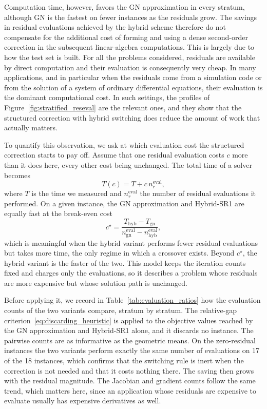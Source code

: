 \documentclass{article}
\numberwithin{equation}{section}
\theoremstyle{plain}
\begin{document}
Computation time, however, favors the GN approximation in every stratum, although GN is the fastest on fewer instances as the residuals grow. The savings in residual evaluations achieved by the hybrid scheme therefore do not compensate for the additional cost of forming and using a dense second-order correction in the subsequent linear-algebra computations. This is largely due to how the test set is built. For all the problems considered, residuals are available by direct computation and their evaluation is consequently very cheap. In many applications, and in particular when the residuals come from a simulation code or from the solution of a system of ordinary differential equations, their evaluation is the dominant computational cost. In such settings, the profiles of Figure~\ref{fig:stratified_reseval} are the relevant ones, and they show that the structured correction with hybrid switching does reduce the amount of work that actually matters. 

To quantify this observation, we ask at which evaluation cost the structured correction starts to pay off. Assume that one residual evaluation costs $c$ more than it does here, every other cost being unchanged. The total time of a solver becomes
\begin{equation}\label{eq:residual_cost_model}
	T(c) = T + c\, n_r^{\mathrm{eval}},
\end{equation}
where $T$ is the time we measured and $n_r^{\mathrm{eval}}$ the number of residual evaluations it performed. On a given instance, the GN approximation and Hybrid-SR1 are equally fast at the break-even cost
\begin{equation}\label{eq:breakeven_cost}
	c^\star = \dfrac{T_{\mathrm{hyb}}-T_{\mathrm{gn}}}{n^{\mathrm{eval}}_{\mathrm{gn}}-n^{\mathrm{eval}}_{\mathrm{hyb}}},
\end{equation}
which is meaningful when the hybrid variant performs fewer residual evaluations but takes more time, the only regime in which a crossover exists. Beyond $c^\star$, the hybrid variant is the faster of the two. This model keeps the iteration counts fixed and charges only the evaluations, so it describes a problem whose residuals are more expensive but whose solution path is unchanged.

Before applying it, we record in Table~\ref{tab:evaluation_ratios} how the evaluation counts of the two variants compare, stratum by stratum. The relative-gap criterion~\eqref{eq:discarding_heuristic} is applied to the objective values reached by the GN approximation and Hybrid-SR1 alone, and it discards no instance. The pairwise counts are as informative as the geometric means. On the zero-residual instances the two variants perform exactly the same number of evaluations on 17 of the 18 instances, which confirms that the switching rule is inert when the correction is not needed and that it costs nothing there. The saving then grows with the residual magnitude. The Jacobian and gradient counts follow the same trend, which matters here, since an application whose residuals are expensive to evaluate usually has expensive derivatives as well.
\end{document}
